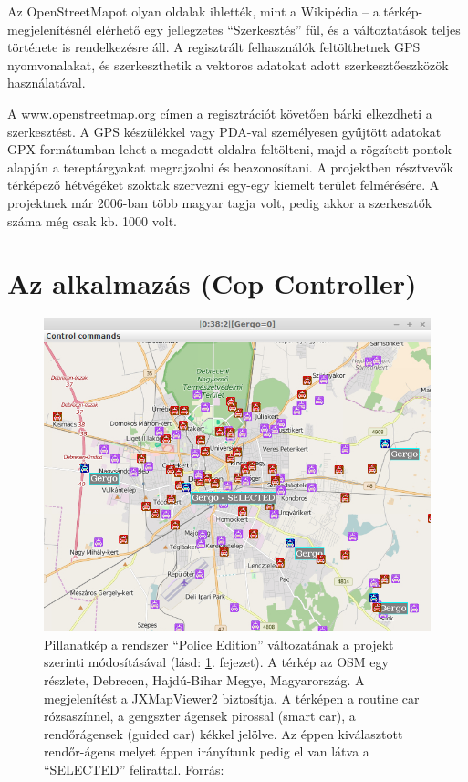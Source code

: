 \documentclass[a4paper,12pt]{report}
\begin{document}
\vspace{2mm}
Az OpenStreetMapot olyan oldalak ihlették, mint a Wikipédia – a térkép-megjelenítésnél elérhető egy jellegzetes ``Szerkesztés'' fül, és a változtatások teljes története is rendelkezésre áll. A regisztrált felhasználók feltölthetnek GPS nyomvonalakat, és szerkeszthetik a vektoros adatokat adott szerkesztőeszközök használatával.

A \url{www.openstreetmap.org} \cite{osm} címen a regisztrációt követően bárki elkezdheti a szerkesztést. A GPS készülékkel vagy PDA-val személyesen gyűjtött adatokat GPX formátumban lehet a megadott oldalra feltölteni, majd a rögzített pontok alapján a tereptárgyakat megrajzolni és beazonosítani. A projektben résztvevők térképező hétvégéket szoktak szervezni egy-egy kiemelt terület felmérésére. A projektnek már 2006-ban több magyar tagja volt, pedig akkor a szerkesztők száma még csak kb. 1000 volt.

\newpage
\chapter{Az alkalmazás (Cop Controller)}
\label{theapp}

\begin{figure}[h]
\centerline{
\includegraphics[width=6in]{img/copselected}}
\caption{Pillanatkép a rendszer ``Police Edition'' változatának a projekt szerinti módosításával (lásd: \ref{theapp}. fejezet). A térkép az OSM egy részlete, Debrecen, Hajdú-Bihar Megye, Magyarország. A megjelenítést a JXMapViewer2 \cite{jxmapv} biztosítja. A térképen a routine car rózsaszínnel, a gengszter ágensek pirossal (smart car), a rendőrágensek (guided car) kékkel jelölve. Az éppen kiválasztott rendőr-ágens melyet éppen irányítunk pedig el van látva a ``SELECTED'' felirattal. Forrás: \cite{infocomjournal} 
\label{police}}
\end{figure}
\end{document}
